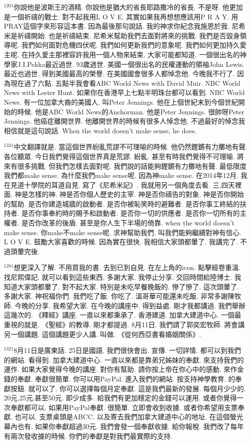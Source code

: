 \documentclass{book}
\begin{document}
$^{1201}$你說他是波斯王的酒精.
你說他是猶大的省長耶路撒冷的省長.
不是呀.
他更加是一個祈禱的戰士.
對不起我用L O V E.
其實如果我再想想應該用P R A Y.
用PRAY這個字來形容這本書.
因為最後那句說話.
我的神求你紀念我施恩於我.
尼希米是祈禱開始.
也是祈禱結束.
尼希米幫助我們去面對將來的挑戰.
我們是否毀身領導呢.
我們如何面對危機四伏呢.
我們如何更新我們的意象呢.
我們如何更加持久愛主呢.
在持久愛主那裡容許我用一個人物來結束.
大家可能都知道.
一個很出名的神學家J.I.Pekka最近過世.
93歲過世.
美國一個很出名的民權運動的領袖John Lewis.
最近也過世.
得到美國最高的榮譽.
在美國國會很多人都悼念他.
今晚我不行了.
因為現在過了六點.
五點半我會看ABC World News with David Muir.
NBC World News with Lester Hunt.
如果你在香港早上七點半明珠台都可以看到.
NBC World News.
有一位加拿大裔的美國人.
叫Peter Jennings.
他在上個世紀末到今個世紀開始的時候.
他是ABC World News的Anchorman.
他是Peter Jennings.
很帥呀Peter Jennings.
他癌症離開世界.
他離開世界的時候有很多人悼念他.
不過最好的悼念我相信就是這句說話.
When the world doesn't make sense, he does.

$^{1241}$中文翻譯就是.
當這個世界紛亂荒謬不可理喻的時候.
他仍然鏗鏘有力擲地有聲.
各位聽眾.
今日我們覺得這個世界真是荒謬.
紛亂.
甚至有時我們覺得不可理喻.
將來有很多挑戰.
但我們怎樣去面對呢.
我們說的話能夠鏗鏘有力擲地有聲.
最低限度我們都make sense.
為什麼我們make sense呢.
因為神make sense.
在2014年12月.
我在見道十學院的耳道自見.
寫了《尼希米記》.
我就用另一個角度去看.
三,四天裡面.
神是怎樣的神.
神是否你個人歷史的主宰.
神是否你禱告的對象.
神是否你開始的幫助.
是否你建造城牆的啟動者.
是否你被恥笑時的避難者.
是否你事工終結的扶持者.
是否你事奉約時的賜予和啟動者.
是否你一切的供應者.
是否你一切所有的主權者.
是否你改革的後盾.
甚至是你人生下半場的倚靠.
when the world doesn't make sense.
你make不make sense呢.
求神幫助我們.
叫我們能夠繼續對神有信心.
L O V E.
鼓勵大家喜歡的時候.
因為實在很快.
我相信大家頭都暈了.
我講完了.
不過頭暈完後.

$^{1281}$想更深入了解.
不用買我的書.
去到已到自見.
在左上角的icon.
點擊經卷重溫.
找尼熙偉記.
就可以看到這些東西.
多謝大家.
我停止分享.
交回時間給陸博士.
我知道大家頭都暈了.
對不起大家.
特別是未吃早餐晚飯的.
慘了慘了.
這次頭暈了.
多謝大家.
神祝福你們.
我們吃了飯.
你吃了.
溫哥華可能還未吃飯.
非常多謝陳牧師.
今晚的分享.
我希望大家.
在今晚的講座中.
得到益處.
剛才我都講過.
我們舉辦這幾次的.
《釋經》講座.
一直以來都秉承了.
香港建道.
加拿大建道中心.
一個最重視的就是.
《聖經》的教導.
剛才都提過.
8月11日.
我們請了郭奕宏牧師.
將會講另一個講題.
這個講題更少人講.
叫做.
《從何西亞書看婚姻關係》.

$^{1321}$8月11日是廣東話.
25日是國語.
我們很快會出.
宣傳.
一切詳情.
都可以到我們的網站.
看得到.
加拿大建道中心.
一直以來都是靠弟兄姊妹的奉獻.
來支持我們的運作.
如果大家覺得今晚的講座.
對你有幫助.
請你按上帝在你心中的感動.
來作金錢的奉獻.
奉獻很簡單.
你可以用PayPal.
進入我們的網站.
按支持神學教育.
的奉獻按鈕.
就可以了.
你可以選擇每個月定奉獻.
這是我們最新的發展.
每個月少少的.
20元,25元,甚至50元.
即少成多.
給我們有更加穩定的金錢可以運用.
或者你覺得一次奉獻都可以.
如果用PayPal奉獻.
很簡單.
立即會收到收據.
或者你希望用支票奉獻.
也可以.
支票桌頭是ABCC.
以及寄去我們加拿大建道中心的地址.
在這個螢光幕內也有.
如果你奉獻超過30元.
我們會發一個奉獻收據.
給你報稅.
我們改了每年有兩次發收據的時候.
你們的奉獻是對我們最實際的支持.
\end{document}
